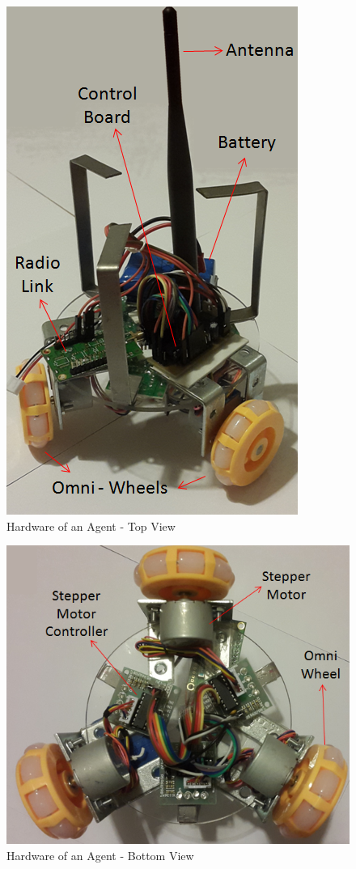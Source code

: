 \begin{figure}[H]
\caption{Hardware of an Agent - Top View} \label{topview_ref}
\centerline{\includegraphics[scale = 0.60]{hardware1}}
\end{figure} 

\begin{figure}[H]
\caption{Hardware of an Agent - Bottom View} \label{bottomview_ref}
\centerline{\includegraphics[scale = 0.60]{hardware2}}
\end{figure} 
		
